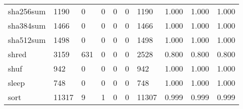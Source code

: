 \begin{longtable}{lp{2.0cm}p{2.0cm}p{2.0cm}p{2.0cm}p{2.0cm}p{2.0cm}p{2.0cm}p{2.0cm}p{2.0cm}}
sha256sum &                   1190 &                                  0 &                                 0 &                                0 &                                 0 &                            1190 &                                1.000 &                                  1.000 &                                1.000 \\
sha384sum &                   1466 &                                  0 &                                 0 &                                0 &                                 0 &                            1466 &                                1.000 &                                  1.000 &                                1.000 \\
sha512sum &                   1498 &                                  0 &                                 0 &                                0 &                                 0 &                            1498 &                                1.000 &                                  1.000 &                                1.000 \\
shred     &                   3159 &                                631 &                                 0 &                                0 &                                 0 &                            2528 &                                0.800 &                                  0.800 &                                0.800 \\
shuf      &                    942 &                                  0 &                                 0 &                                0 &                                 0 &                             942 &                                1.000 &                                  1.000 &                                1.000 \\
sleep     &                    748 &                                  0 &                                 0 &                                0 &                                 0 &                             748 &                                1.000 &                                  1.000 &                                1.000 \\
sort      &                  11317 &                                  9 &                                 1 &                                0 &                                 0 &                           11307 &                                0.999 &                                  0.999 &                                0.999 \\

\end{longtable}
